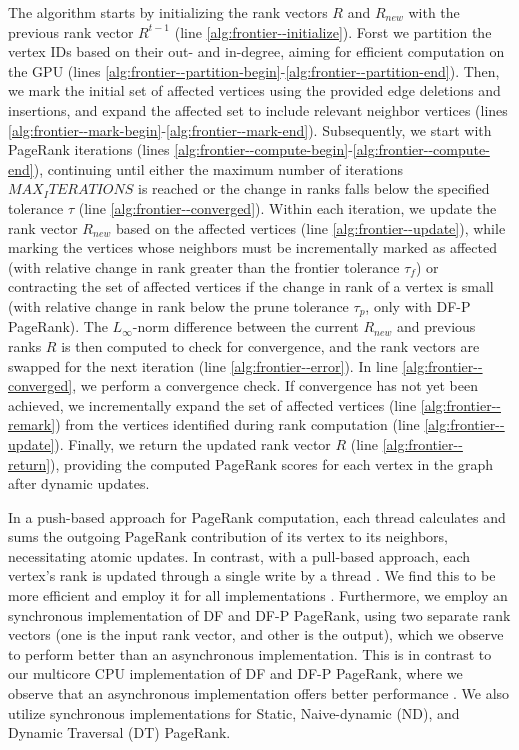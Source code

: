The algorithm starts by initializing the rank vectors $R$ and $R_{new}$ with the previous rank vector $R^{t-1}$ (line \ref{alg:frontier--initialize}). Forst we partition the vertex IDs based on their out- and in-degree, aiming for efficient computation on the GPU (lines \ref{alg:frontier--partition-begin}-\ref{alg:frontier--partition-end}). Then, we mark the initial set of affected vertices using the provided edge deletions and insertions, and expand the affected set to include relevant neighbor vertices (lines \ref{alg:frontier--mark-begin}-\ref{alg:frontier--mark-end}). Subsequently, we start with PageRank iterations (lines \ref{alg:frontier--compute-begin}-\ref{alg:frontier--compute-end}), continuing until either the maximum number of iterations $MAX_ITERATIONS$ is reached or the change in ranks falls below the specified tolerance $\tau$ (line \ref{alg:frontier--converged}). Within each iteration, we update the rank vector $R_{new}$ based on the affected vertices (line \ref{alg:frontier--update}), while marking the vertices whose neighbors must be incrementally marked as affected (with relative change in rank greater than the frontier tolerance $\tau_f$) or contracting the set of affected vertices if the change in rank of a vertex is small (with relative change in rank below the prune tolerance $\tau_p$, only with DF-P PageRank). The $L_\infty$-norm difference between the current $R_{new}$ and previous ranks $R$ is then computed to check for convergence, and the rank vectors are swapped for the next iteration (line \ref{alg:frontier--error}). In line \ref{alg:frontier--converged}, we perform a convergence check. If convergence has not yet been achieved, we incrementally expand the set of affected vertices (line \ref{alg:frontier--remark}) from the vertices identified during rank computation (line \ref{alg:frontier--update}). Finally, we return the updated rank vector $R$ (line \ref{alg:frontier--return}), providing the computed PageRank scores for each vertex in the graph after dynamic updates.

In a push-based approach for PageRank computation, each thread calculates and sums the outgoing PageRank contribution of its vertex to its neighbors, necessitating atomic updates. In contrast, with a pull-based approach, each vertex's rank is updated through a single write by a thread \cite{verstraaten2015quantifying}. We find this to be more efficient and employ it for all implementations \cite{sahu2024df}. Furthermore, we employ an synchronous implementation of DF and DF-P PageRank, using two separate rank vectors (one is the input rank vector, and other is the output), which we observe to perform better than an asynchronous implementation. This is in contrast to our multicore CPU implementation of DF and DF-P PageRank, where we observe that an asynchronous implementation offers better performance \cite{sahu2024df, sahu2024incrementally}. We also utilize synchronous implementations for Static, Naive-dynamic (ND), and Dynamic Traversal (DT) PageRank.


